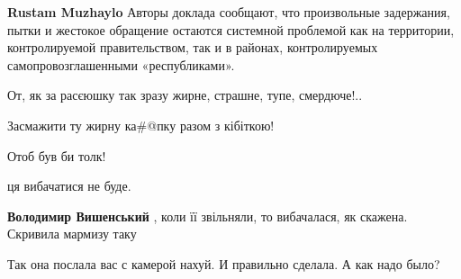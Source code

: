 \begin{itemize}
\begin{itemize}
 
\textbf{Rustam Muzhaylo} Авторы доклада сообщают, что произвольные задержания,
пытки и жестокое обращение остаются системной проблемой как на территории,
контролируемой правительством, так и в районах, контролируемых
самопровозглашенными «республиками».

\end{itemize}


От, як за расєюшку так зразу жирне, страшне, тупе, смердюче!..

Засмажити ту жирну ка\#@пку разом з кібіткою!

Отоб був би толк!


 

ця вибачатися не буде.

\begin{itemize}
 
\textbf{Володимир Вишенський} , коли її звільняли, то вибачалася, як скажена. Скривила мармизу таку
\end{itemize}

 
Так она послала вас с камерой нахуй. И правильно сделала. А как надо было?

\begin{itemize}
 

\end{itemize}
\end{itemize}
